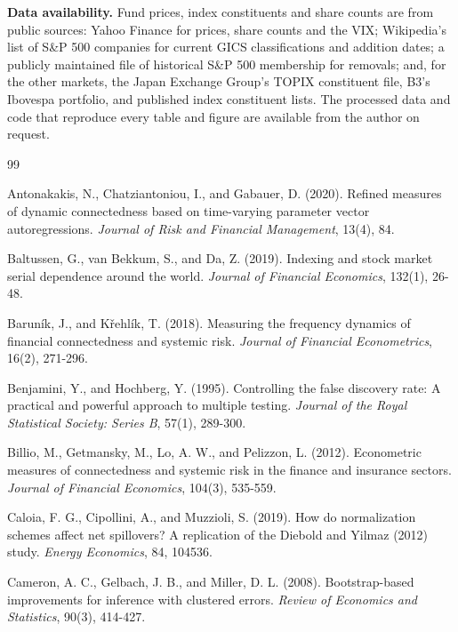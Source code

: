 \documentclass[11pt]{article}
\begin{document}
\bigskip
\noindent\textbf{Data availability.} Fund prices, index constituents and share counts are from public sources: Yahoo Finance for prices, share counts and the VIX; Wikipedia's list of S\&P 500 companies for current GICS classifications and addition dates; a publicly maintained file of historical S\&P 500 membership for removals; and, for the other markets, the Japan Exchange Group's TOPIX constituent file, B3's Ibovespa portfolio, and published index constituent lists. The processed data and code that reproduce every table and figure are available from the author on request.

\begin{thebibliography}{99}
\setlength{\itemsep}{2pt}

Antonakakis, N., Chatziantoniou, I., and Gabauer, D. (2020). Refined measures of dynamic connectedness based on time-varying parameter vector autoregressions. \textit{Journal of Risk and Financial Management}, 13(4), 84.

Baltussen, G., van Bekkum, S., and Da, Z. (2019). Indexing and stock market serial dependence around the world. \textit{Journal of Financial Economics}, 132(1), 26-48.

Barun\'ik, J., and K\v{r}ehl\'ik, T. (2018). Measuring the frequency dynamics of financial connectedness and systemic risk. \textit{Journal of Financial Econometrics}, 16(2), 271-296.

Benjamini, Y., and Hochberg, Y. (1995). Controlling the false discovery rate: A practical and powerful approach to multiple testing. \textit{Journal of the Royal Statistical Society: Series B}, 57(1), 289-300.

Billio, M., Getmansky, M., Lo, A. W., and Pelizzon, L. (2012). Econometric measures of connectedness and systemic risk in the finance and insurance sectors. \textit{Journal of Financial Economics}, 104(3), 535-559.

Caloia, F. G., Cipollini, A., and Muzzioli, S. (2019). How do normalization schemes affect net spillovers? A replication of the Diebold and Yilmaz (2012) study. \textit{Energy Economics}, 84, 104536.

Cameron, A. C., Gelbach, J. B., and Miller, D. L. (2008). Bootstrap-based improvements for inference with clustered errors. \textit{Review of Economics and Statistics}, 90(3), 414-427.


\end{thebibliography}
\end{document}
